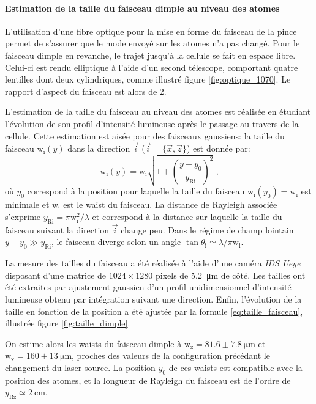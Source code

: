 \paragraph*{Estimation de la taille du faisceau dimple au niveau des atomes}
L'utilisation d'une fibre optique pour la mise en forme du faisceau de la pince permet de s'assurer que le mode envoyé sur les atomes n'a pas changé. Pour le faisceau dimple en revanche, le trajet jusqu'à la cellule se fait en espace libre. Celui-ci est rendu elliptique à l'aide d'un second télescope, comportant quatre lentilles dont deux cylindriques, comme illustré figure \ref{fig:optique_1070}. Le rapport d'aspect du faisceau est alors de 2. 




L'estimation de la taille du faisceau au niveau des atomes est réalisée en étudiant l'évolution de son profil d'intensité lumineuse après le passage au travers de la cellule. 
Cette estimation est aisée pour des faisceaux gaussiens: la taille du faisceau $\mathrm{w}_{\mathrm{i}}(y)$ dans la direction $\vec{i}$ ($\vec{i}= \lbrace \vec{x},\vec{z} \rbrace$) est donnée par:
\begin{equation}
\mathrm{w}_{\mathrm{i}}(y)=\mathrm{w}_{\mathrm{i}} \sqrt{1+\left( \frac{y-y_0}{y_{\mathrm{Ri}}} \right)^2} \text{ ,}
\label{eq:taille_faisceau}
\end{equation}
où $y_0$ correspond à la position pour laquelle la taille du faisceau $\mathrm{w}_{\mathrm{i}}(y_0)=\mathrm{w}_{\mathrm{i}}$ est minimale et $\mathrm{w}_{\mathrm{i}}$ est le waist du faisceau. La distance de Rayleigh associée s'exprime $y_{\mathrm{Ri}}=\pi \mathrm{w}_{\mathrm{i}}^2 / \lambda$ et correspond à la distance sur laquelle la taille du faisceau suivant la direction $\vec{i}$ change peu. Dans le régime de champ lointain $y-y_0 \gg y_{\mathrm{Ri}}$, le faisceau diverge selon un angle $\tan \theta_{\mathrm{i}} \simeq \lambda / \pi \mathrm{w}_{\mathrm{i}}$.

La mesure des tailles du faisceau a été réalisée à l'aide d'une caméra \emph{IDS Ueye} disposant d'une matrice de $1024 \times 1280$ pixels de \SI{5.2}{\micro\metre} de côté. Les tailles ont été extraites par ajustement gaussien d'un profil unidimensionnel d'intensité lumineuse obtenu par intégration suivant une direction. Enfin, l'évolution de la taille en fonction de la position a été ajustée par la formule \ref{eq:taille_faisceau}, illustrée figure \ref{fig:taille_dimple}.



On estime alors les waists du faisceau dimple à $\mathrm{w_z}=81.6\pm\SI{7.8}{\micro\metre}$ et $\mathrm{w_x}=160\pm \SI{13}{\micro\metre}$, proches des valeurs de la configuration précédant le changement du laser source. La position $y_0$ de ces waists est compatible avec la position des atomes, et la longueur de Rayleigh du faisceau est de l'ordre de $y_{\mathrm{Rz}}\simeq \SI{2}{\centi\metre}$.



